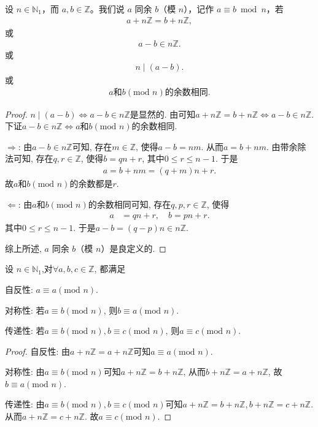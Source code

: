 \documentclass[../../main.tex]{subfiles}
\begin{document}
\begin{definition}[同余(模$n$)]
设 $n\in \mathbb{N}_1$，而 $a,b\in \mathbb{Z}$。我们说 $a$ 同余 $b$（模 $n$），记作 $a\equiv b\bmod n$，若
\begin{align*}
a + n\mathbb{Z}=b + n\mathbb{Z},
\end{align*}
或
\begin{align*}
a - b\in n\mathbb{Z}.
\end{align*}
或
\begin{align*}
n\mid (a-b).
\end{align*}
或
\begin{align*}
    a\text{和}b (\mathrm{mod}\,\,n)\text{的余数相同}.
\end{align*}
\end{definition}
\begin{proof}
$n\mid (a-b)\Leftrightarrow a - b\in n\mathbb{Z}$是显然的.
由可知$a+n\mathbb{Z} =b+n\mathbb{Z} \Leftrightarrow a-b\in n\mathbb{Z} .$下证$a - b \in n\mathbb{Z} \Leftrightarrow a$和$b (\mathrm{mod}\,\,n)$的余数相同.

$\Rightarrow$: 由$a - b \in n\mathbb{Z}$可知, 存在$m \in \mathbb{Z}$, 使得$a - b = nm$. 从而$a = b + nm$. 由带余除法可知, 存在$q, r \in \mathbb{Z}$, 使得$b = qn + r$, 其中$0 \leqslant r \leqslant n - 1$. 于是
\begin{align*}
a = b + nm 
= (q + m)n + r.
\end{align*}
故$a$和$b (\mathrm{mod}\,\,n)$的余数都是$r$.

$\Leftarrow$: 由$a$和$b (\mathrm{mod}\,\,n)$的余数相同可知, 存在$q, p, r \in \mathbb{Z}$, 使得
\begin{align*}
a &= qn + r, \quad b = pn + r.
\end{align*}
其中$0 \leqslant r \leqslant n - 1$. 于是$a - b = (q - p)n \in n\mathbb{Z}$.

综上所述, $a$ 同余 $b$（模 $n$）是良定义的.
\end{proof}

\begin{proposition}
设 $n\in \mathbb{N}_1$,对$\forall a, b, c \in \mathbb{Z}$, 都满足

自反性: $a \equiv a (\mathrm{mod}\,\,n)$.

对称性: 若$a \equiv b (\mathrm{mod}\,\,n)$, 则$b \equiv a (\mathrm{mod}\,\,n)$.

传递性: 若$a \equiv b (\mathrm{mod}\,\,n), b \equiv c (\mathrm{mod}\,\,n)$, 则$a \equiv c (\mathrm{mod}\,\,n)$.
\end{proposition}
\begin{proof}
自反性: 由$a + n\mathbb{Z} = a + n\mathbb{Z}$可知$a \equiv a (\mathrm{mod}\,\,n)$.

对称性: 由$a \equiv b (\mathrm{mod}\,\,n)$可知$a + n\mathbb{Z} = b + n\mathbb{Z}$, 从而$b + n\mathbb{Z} = a + n\mathbb{Z}$, 故$b \equiv a (\mathrm{mod}\,\,n)$.

传递性: 由$a \equiv b (\mathrm{mod}\,\,n), b \equiv c (\mathrm{mod}\,\,n)$可知$a + n\mathbb{Z} = b + n\mathbb{Z}, b + n\mathbb{Z} = c + n\mathbb{Z}$. 从而$a + n\mathbb{Z} = c + n\mathbb{Z}$. 故$a \equiv c (\mathrm{mod}\,\,n)$. 
\end{proof}
\end{document}
